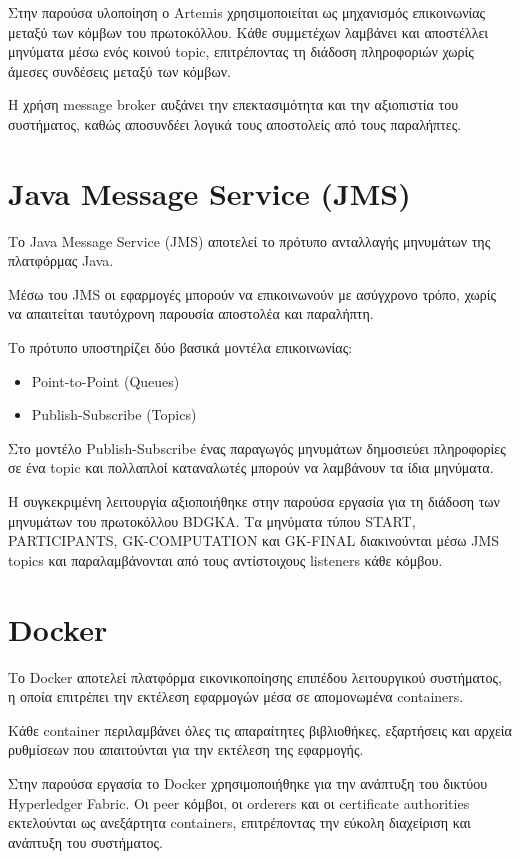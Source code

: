 \documentclass[12pt,a4paper]{report}
\begin{document}
Στην παρούσα υλοποίηση ο Artemis χρησιμοποιείται ως μηχανισμός
επικοινωνίας μεταξύ των κόμβων του πρωτοκόλλου. Κάθε συμμετέχων
λαμβάνει και αποστέλλει μηνύματα μέσω ενός κοινού topic,
επιτρέποντας τη διάδοση πληροφοριών χωρίς άμεσες συνδέσεις
μεταξύ των κόμβων.

Η χρήση message broker αυξάνει την επεκτασιμότητα και την
αξιοπιστία του συστήματος, καθώς αποσυνδέει λογικά τους
αποστολείς από τους παραλήπτες.

\section{Java Message Service (JMS)}

Το Java Message Service (JMS) αποτελεί το πρότυπο ανταλλαγής
μηνυμάτων της πλατφόρμας Java.

Μέσω του JMS οι εφαρμογές μπορούν να επικοινωνούν με
ασύγχρονο τρόπο, χωρίς να απαιτείται ταυτόχρονη παρουσία
αποστολέα και παραλήπτη.

Το πρότυπο υποστηρίζει δύο βασικά μοντέλα επικοινωνίας:

\begin{itemize}
\item Point-to-Point (Queues)
\item Publish-Subscribe (Topics)
\end{itemize}

Στο μοντέλο Publish-Subscribe ένας παραγωγός μηνυμάτων
δημοσιεύει πληροφορίες σε ένα topic και πολλαπλοί
καταναλωτές μπορούν να λαμβάνουν τα ίδια μηνύματα.

Η συγκεκριμένη λειτουργία αξιοποιήθηκε στην παρούσα εργασία
για τη διάδοση των μηνυμάτων του πρωτοκόλλου BDGKA.
Τα μηνύματα τύπου START, PARTICIPANTS, GK-COMPUTATION και
GK-FINAL διακινούνται μέσω JMS topics και παραλαμβάνονται
από τους αντίστοιχους listeners κάθε κόμβου.

\section{Docker}

Το Docker αποτελεί πλατφόρμα εικονικοποίησης επιπέδου
λειτουργικού συστήματος, η οποία επιτρέπει την εκτέλεση
εφαρμογών μέσα σε απομονωμένα containers.

Κάθε container περιλαμβάνει όλες τις απαραίτητες
βιβλιοθήκες, εξαρτήσεις και αρχεία ρυθμίσεων που
απαιτούνται για την εκτέλεση της εφαρμογής.

Στην παρούσα εργασία το Docker χρησιμοποιήθηκε για την
ανάπτυξη του δικτύου Hyperledger Fabric. Οι peer κόμβοι,
οι orderers και οι certificate authorities εκτελούνται
ως ανεξάρτητα containers, επιτρέποντας την εύκολη
διαχείριση και ανάπτυξη του συστήματος.
\end{document}

